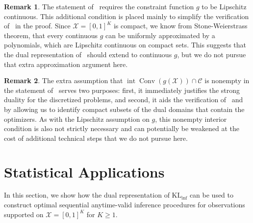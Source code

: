 \documentclass{article}
\theoremstyle{plain}
\theoremstyle{definition}
\newtheorem{remark}[remark]{Remark}
\newcommand{\KLinf}{\operatorname{KL_{inf}}}
\newcommand{\calC}{\mathcal C}
\newcommand{\calX}{\mathcal X}
\begin{document}
\begin{remark}
    \label{remark:lipschitz-constaint} The statement of~ requires the constraint function $g$ to be Lipschitz continuous. This additional condition  is  placed  mainly to simplify the verification of~ in the proof. Since $\calX =[0,1]^K$ is compact, we know from Stone-Weierstrass theorem, that every continuous $g$ can be uniformly approximated by a polynomials, which are Lipschitz continuous on compact sets. This suggests that the dual representation of~ should extend to continuous $g$, but we do not pursue that extra approximation argument here. 
\end{remark}
\begin{remark}
    \label{remark:nonempty-interior} The extra assumption that $\operatorname{int}\operatorname{Conv}(g(\calX)) \cap \calC$ is nonempty in the statement of~ serves two purposes: first, it immediately justifies the strong duality for the discretized problems, and second, it aids the verification of~ and~ by allowing us to identify compact subsets of the dual domains that contain the optimizers.  As with the Lipschitz assumption on $g$, this nonempty interior condition is also not strictly necessary and can potentially be weakened at the cost of additional technical steps that we do not pursue here.  
\end{remark}






    












\section{Statistical Applications}
\label{sec:statistical-applications}

In this section, we show how the dual representation of $\KLinf$ can be used to construct optimal sequential anytime-valid inference  procedures for observations supported on $\calX = [0,1]^K$ for $K \geq 1$. 
\end{document}
